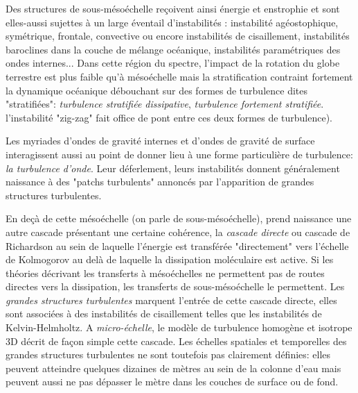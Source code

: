 Des structures de sous-mésoéchelle reçoivent ainsi énergie et enstrophie et sont elles-aussi sujettes à un large éventail d'instabilités \citep{mcwilliams_submesoscale_2016}: instabilité agéostophique, symétrique, frontale, convective ou encore instabilités de cisaillement, instabilités baroclines dans la couche de mélange océanique, instabilités paramétriques des ondes internes... Dans cette région du spectre, l'impact de la rotation du globe terrestre est plus faible qu'à mésoéchelle mais la stratification contraint fortement la dynamique océanique débouchant sur des formes de turbulence dites "stratifiées": \textit{turbulence stratifiée dissipative}, \textit{turbulence fortement stratifiée}. l'instabilité "zig-zag" fait office de pont entre ces deux formes de turbulence).

Les myriades d'ondes de gravité internes et d'ondes de gravité de surface interagissent aussi au point de donner lieu à une forme particulière de turbulence: \textit{la turbulence d'onde}. Leur déferlement, leurs instabilités donnent généralement naissance à des "patchs turbulents" annoncés par l'apparition de grandes structures turbulentes.

En deçà de cette mésoéchelle (on parle de sous-mésoéchelle), prend naissance une autre cascade présentant une certaine cohérence, la \textit{cascade directe} ou cascade de Richardson au sein de laquelle l'énergie est transférée "directement" vers l'échelle de Kolmogorov au delà de laquelle la dissipation moléculaire est active. Si les théories décrivant les transferts à mésoéchelles ne permettent pas de routes directes vers la dissipation, les transferts de sous-mésoéchelle le permettent.
Les \textit{grandes structures turbulentes} marquent l'entrée de cette cascade directe, elles sont associées à des instabilités de cisaillement telles que les instabilités de Kelvin-Helmholtz. A \textit{micro-échelle}, le modèle de turbulence homogène et isotrope 3D décrit de façon simple cette cascade. Les échelles spatiales et temporelles des grandes structures turbulentes ne sont toutefois pas clairement définies: elles peuvent atteindre quelques dizaines de mètres au sein de la colonne d'eau mais peuvent aussi ne pas dépasser le mètre dans les couches de surface ou de fond.

